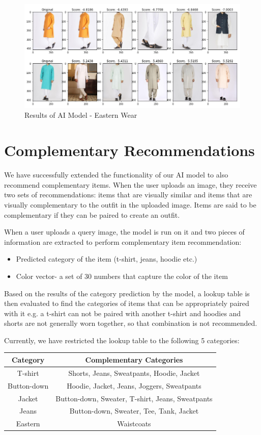 \begin{figure}[H]
\includegraphics[width=12cm]{images/Recommendations4.PNG} 
\centering
\caption{Results of AI Model - Eastern Wear}
\label{architecture}
\end{figure}

\section{Complementary Recommendations}

We have successfully extended the functionality of our AI model to also recommend complementary items. When the user uploads an image, they receive two sets of recommendations: items that are visually similar and items that are visually complementary to the outfit in the uploaded image. Items are said to be complementary if they can be paired to create an outfit.

When a user uploads a query image, the model is run on it and two pieces of information are extracted to perform complementary item recommendation:
\begin{itemize}
    \item Predicted category of the item (t-shirt, jeans, hoodie etc.)
    \item Color vector- a set of 30 numbers that capture the color of the item
\end{itemize}

Based on the results of the category prediction by the model, a lookup table is then evaluated to find the categories of items that can be appropriately paired with it e.g. a t-shirt can not be paired with another t-shirt and hoodies and shorts are not generally worn together, so that combination is not recommended.

Currently, we have restricted the lookup table to the following 5 categories:

\begin{center}
\begin{tabular}{ |c|c| } 
 \hline
 \textbf{Category} & \textbf{Complementary Categories}\\
 \hline
T-shirt & Shorts, Jeans, Sweatpants, Hoodie, Jacket\\
 \hline
Button-down & Hoodie, Jacket, Jeans, Joggers, Sweatpants\\
 \hline
Jacket & Button-down, Sweater, T-shirt, Jeans, Sweatpants\\
 \hline
Jeans & Button-down, Sweater, Tee, Tank, Jacket\\
 \hline
 Eastern & Waistcoats\\
  \hline
\end{tabular}
\end{center}


